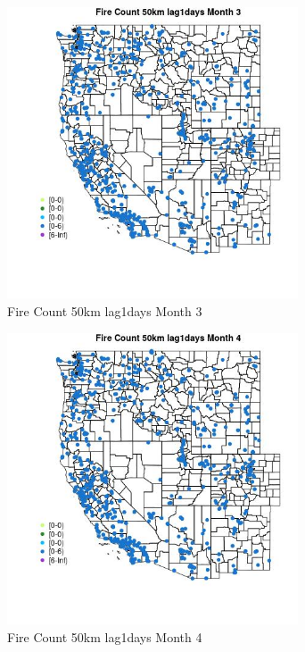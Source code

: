 \begin{figure} 
\centering  
\includegraphics[width=0.77\textwidth]{Code_Outputs/Report_ML_input_PM25_Step4_part_e_de_duplicated_aves_compiled_2019-05-21wNAs_MapObsMo3Fire_Count_50km_lag1days.jpg} 
\caption{\label{fig:Report_ML_input_PM25_Step4_part_e_de_duplicated_aves_compiled_2019-05-21wNAsMapObsMo3Fire_Count_50km_lag1days}Fire Count 50km lag1days Month 3} 
\end{figure} 
 

\begin{figure} 
\centering  
\includegraphics[width=0.77\textwidth]{Code_Outputs/Report_ML_input_PM25_Step4_part_e_de_duplicated_aves_compiled_2019-05-21wNAs_MapObsMo4Fire_Count_50km_lag1days.jpg} 
\caption{\label{fig:Report_ML_input_PM25_Step4_part_e_de_duplicated_aves_compiled_2019-05-21wNAsMapObsMo4Fire_Count_50km_lag1days}Fire Count 50km lag1days Month 4} 
\end{figure} 
 


